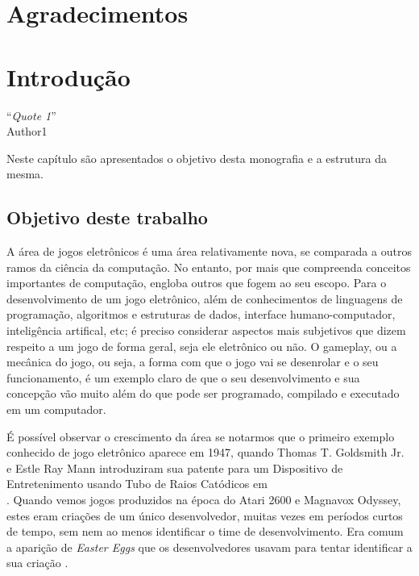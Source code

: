 \documentclass[brazil]{abnt}
\begin{document}
\chapter*{Agradecimentos}

\tableofcontents{}
\listoffigures
\listoftables

\chapter{Introdução\label{cap:introducao}}

\vfill{}
\begin{flushright}{}``\emph{Quote 1}''\\
{\small Author1}\end{flushright}{\small \par}
\vfill{}

Neste capítulo são apresentados o objetivo desta monografia e a estrutura
da mesma.
\newpage


\section{Objetivo deste trabalho}

A área de jogos eletrônicos é uma área relativamente nova, se comparada a outros ramos da ciência da computação. No entanto, por mais que compreenda conceitos importantes de computação, engloba outros que fogem ao seu escopo. Para o desenvolvimento de um jogo eletrônico, além de conhecimentos de linguagens de programação, algoritmos e estruturas de dados, interface humano-computador, inteligência artifical, etc; é preciso considerar aspectos mais subjetivos que dizem respeito a um jogo de forma geral, seja ele eletrônico ou não. O gameplay, ou a mecânica do jogo, ou seja, a forma com que o jogo vai se desenrolar e o seu funcionamento, é um exemplo claro de que o seu desenvolvimento e sua concepção vão muito além do que pode ser programado, compilado e executado em um computador.

É possível observar o crescimento da área se notarmos que o primeiro exemplo conhecido de jogo eletrônico aparece em 1947, quando Thomas T. Goldsmith Jr. e Estle Ray Mann introduziram sua patente para um Dispositivo de Entretenimento usando Tubo de Raios Catódicos em \\\cite{2455992}. Quando vemos jogos produzidos na época do Atari 2600 e Magnavox Odyssey, estes eram criações de um único desenvolvedor, muitas vezes em períodos curtos de tempo, sem nem ao menos identificar o time de desenvolvimento. Era comum a aparição de \textit{Easter Eggs} que os desenvolvedores usavam para tentar identificar a sua criação \cite{PrimeiroDevName}.
\end{document}
